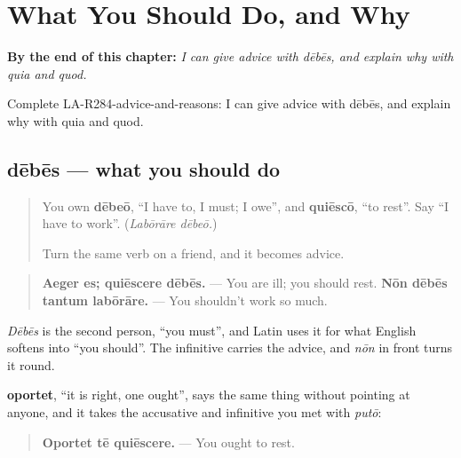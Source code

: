 
\chapter{What You Should Do, and Why}
\label{ch:la-what-you-should-do-and-why}

\begin{chapteropening}
\textbf{By the end of this chapter:} \emph{I can give advice with dēbēs, and explain why with quia and quod.}

Complete LA-R284-advice-and-reasons: I can give advice with dēbēs, and explain why with quia and quod.
\end{chapteropening}

\section[dēbēs, nōn dēbēs; dēbēbās]{dēbēs — what you should do}

\label{lesson:LA-C284-debes}



\begin{quote}
You own \textbf{dēbeō}, \textquotedblleft{}I have to, I must; I owe\textquotedblright{}, and \textbf{quiēscō}, \textquotedblleft{}to rest\textquotedblright{}. Say \textquotedblleft{}I have to work\textquotedblright{}. (\emph{Labōrāre dēbeō.})

Turn the same verb on a friend, and it becomes advice.
\end{quote}

\begin{grammarlens}[title={Grammar Lens: dēbēs + infinitive}]
\begin{quote}
\textbf{Aeger es; quiēscere dēbēs.} — You are ill; you should rest. \textbf{Nōn dēbēs tantum labōrāre.} — You shouldn't work so much.
\end{quote}

\emph{Dēbēs} is the second person, \textquotedblleft{}you must\textquotedblright{}, and Latin uses it for what English softens into \textquotedblleft{}you should\textquotedblright{}. The infinitive carries the advice, and \emph{nōn} in front turns it round.

\textbf{oportet}, \textquotedblleft{}it is right, one ought\textquotedblright{}, says the same thing without pointing at anyone, and it takes the accusative and infinitive you met with \emph{putō}:

\begin{quote}
\textbf{Oportet tē quiēscere.} — You ought to rest.
\end{quote}
\end{grammarlens}

